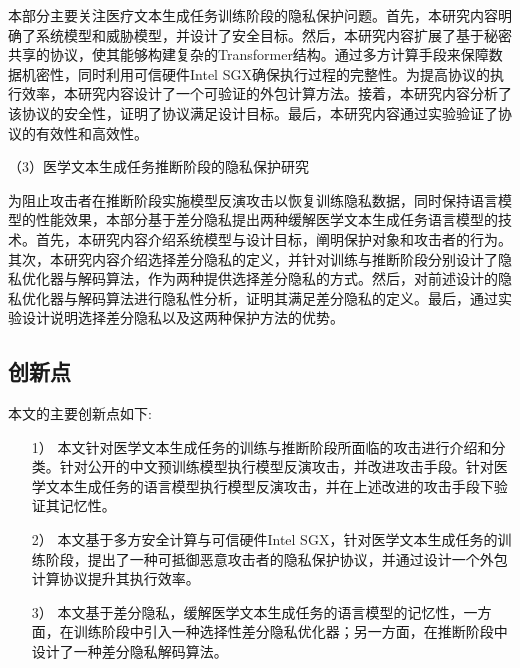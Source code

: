 本部分主要关注医疗文本生成任务训练阶段的隐私保护问题。首先，本研究内容明确了系统模型和威胁模型，并设计了安全目标。然后，本研究内容扩展了基于秘密共享的协议，使其能够构建复杂的Transformer结构。通过多方计算手段来保障数据机密性，同时利用可信硬件Intel SGX确保执行过程的完整性。为提高协议的执行效率，本研究内容设计了一个可验证的外包计算方法。接着，本研究内容分析了该协议的安全性，证明了协议满足设计目标。最后，本研究内容通过实验验证了协议的有效性和高效性。

（3）医学文本生成任务推断阶段的隐私保护研究


为阻止攻击者在推断阶段实施模型反演攻击以恢复训练隐私数据，同时保持语言模型的性能效果，本部分基于差分隐私提出两种缓解医学文本生成任务语言模型的技术。首先，本研究内容介绍系统模型与设计目标，阐明保护对象和攻击者的行为。其次，本研究内容介绍选择差分隐私的定义，并针对训练与推断阶段分别设计了隐私优化器与解码算法，作为两种提供选择差分隐私的方式。然后，对前述设计的隐私优化器与解码算法进行隐私性分析，证明其满足差分隐私的定义。最后，通过实验设计说明选择差分隐私以及这两种保护方法的优势。

\subsection{创新点}

本文的主要创新点如下:

%
%

\begin{itemize}
	\item [1）]
	本文针对医学文本生成任务的训练与推断阶段所面临的攻击进行介绍和分类。针对公开的中文预训练模型执行模型反演攻击，并改进攻击手段。针对医学文本生成任务的语言模型执行模型反演攻击，并在上述改进的攻击手段下验证其记忆性。
	\item [2）]
	本文基于多方安全计算与可信硬件Intel SGX，针对医学文本生成任务的训练阶段，提出了一种可抵御恶意攻击者的隐私保护协议，并通过设计一个外包计算协议提升其执行效率。
	\item [3）]
	本文基于差分隐私，缓解医学文本生成任务的语言模型的记忆性，一方面，在训练阶段中引入一种选择性差分隐私优化器；另一方面，在推断阶段中设计了一种差分隐私解码算法。
	
\end{itemize}


